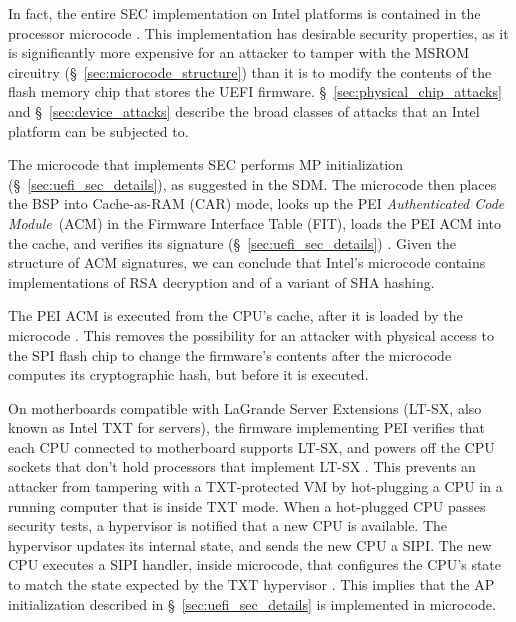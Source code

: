 
In fact, the entire SEC implementation on Intel platforms is contained in the
processor microcode \cite{datta2010trustedboot, datta2013acm, intel2014vapic}.
This implementation has desirable security properties, as it is significantly
more expensive for an attacker to tamper with the MSROM circuitry
(\S~\ref{sec:microcode_structure}) than it is to modify the contents of the
flash memory chip that stores the UEFI firmware.
\S~\ref{sec:physical_chip_attacks} and \S~\ref{sec:device_attacks} describe the
broad classes of attacks that an Intel platform can be subjected to.

The microcode that implements SEC performs MP initialization
(\S~\ref{sec:uefi_sec_details}), as suggested in the SDM. The microcode then
places the BSP into Cache-as-RAM (CAR) mode, looks up the PEI
\textit{Authenticated Code Module}~(ACM) in the Firmware Interface Table (FIT),
loads the PEI ACM into the cache, and verifies its signature
(\S~\ref{sec:uefi_sec_details}) \cite{datta2010trustedboot, intel2012patching,
intel2012uefihypervisor, intel2012ltsx, datta2013acm}. Given the structure of
ACM signatures, we can conclude that Intel's microcode contains implementations
of RSA decryption and of a variant of SHA hashing.

The PEI ACM is executed from the CPU's cache, after it is loaded by the
microcode \cite{datta2010trustedboot, intel2012patching, datta2013acm}. This
removes the possibility for an attacker with physical access to the SPI flash
chip to change the firmware's contents after the microcode computes its
cryptographic hash, but before it is executed.


On motherboards compatible with LaGrande Server Extensions (LT-SX, also known
as Intel TXT for servers), the firmware implementing PEI verifies that each CPU
connected to motherboard supports LT-SX, and powers off the CPU sockets that
don't hold processors that implement LT-SX \cite{intel2012ltsx}. This prevents
an attacker from tampering with a TXT-protected VM by hot-plugging a CPU in a
running computer that is inside TXT mode. When a hot-plugged CPU passes
security tests, a hypervisor is notified that a new CPU is available. The
hypervisor updates its internal state, and sends the new CPU a SIPI. The new
CPU executes a SIPI handler, inside microcode, that configures the CPU's state
to match the state expected by the TXT hypervisor \cite{intel2012ltsx}. This
implies that the AP initialization described in \S~\ref{sec:uefi_sec_details}
is implemented in microcode.


